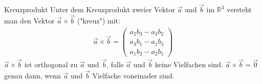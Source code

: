 \documentclass{article}
\begin{document}
\begin{boxx}[Red]{Kreuzprodukt}
    Unter dem Kreuzprodukt zweier Vektor $\vec{a}$ und $\vec{b}$ im $\mathbb{R}^3$
    versteht man den Vektor $\vec{a} \times \vec{b}$ ("kreuz") mit:
    \begin{align*}
        \vec{a} \times \vec{b} = \begin{pmatrix}
            a_2b_3 - a_3b_2 \\
            a_3b_1 - a_1b_3 \\
            a_1b_2 - a_2b_1
        \end{pmatrix}
    \end{align*}
    $\vec{a} \times \vec{b}$ ist orthogonal zu $\vec{a}$ und $\vec{b}$, 
    falls $\vec{a}$ und $\vec{b}$ keine Vielfachen sind.
    $\vec{a} \times \vec{b} = \vec{0}$ genau dann, wenn $\vec{a}$ und $\vec{b}$ Vielfache voneinader sind.
\end{boxx}
\end{document}
